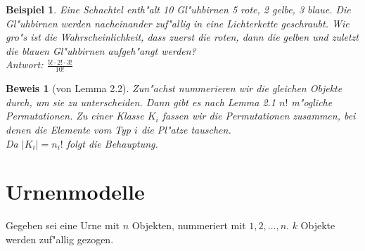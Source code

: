 \documentclass[a4paper,11pt]{book}
\newtheorem{Bsp}{Beispiel}[chapter]
\theoremstyle{nonumberplain}
\newtheorem{Bew}{Beweis}
\begin{document}
\begin{Bsp}
Eine Schachtel enth"alt 10 Gl"uhbirnen 5 rote, 2 gelbe, 3 blaue. Die Gl"uhbirnen werden nacheinander zuf"allig in eine Lichterkette geschraubt. Wie gro"s ist die Wahrscheinlichkeit, dass zuerst die roten, dann die gelben und zuletzt die blauen Gl"uhbirnen aufgeh"angt werden?\\
Antwort: $\frac{5!\cdot 2!\cdot 3!}{10!}$
\end{Bsp}

\begin{Bew}[von Lemma 2.2]
Zun"achst nummerieren wir die gleichen Objekte durch, um sie zu unterscheiden. Dann gibt es nach Lemma 2.1 $n!$ m"ogliche Permutationen. Zu einer Klasse $K_i$ fassen wir die Permutationen zusammen, bei denen die Elemente vom Typ $i$ die Pl"atze tauschen.\\
Da $|K_i|=n_i!$ folgt die Behauptung.
\end{Bew}

\section{Urnenmodelle}
Gegeben sei eine Urne mit $n$ Objekten, nummeriert mit $1,2,\ldots,n$. $k$ Objekte werden zuf"allig gezogen.
\end{document}

